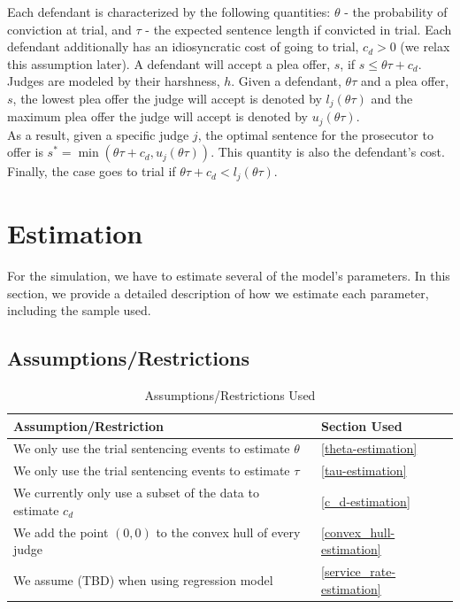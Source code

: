 \documentclass[11pt, oneside]{article}   	%
\theoremstyle{ModifiedStyle}
\begin{document}
  Each defendant is characterized by the following quantities: $\theta$ - the probability of conviction at trial, and $\tau$ - the expected sentence length if convicted in trial. Each defendant additionally has an idiosyncratic cost of going to trial, $c_d >0$ (we relax this assumption later). A defendant will accept a plea offer, $s$, if $s \leq \theta \tau + c_d$.\\

  Judges are modeled by their harshness, $h$. Given a defendant, $\theta \tau$ and a plea offer, $s$, the lowest plea offer the judge will accept is denoted by $l_j(\theta \tau)$ and the maximum plea offer the judge will accept is denoted by $u_j(\theta \tau)$.\\

  As a result, given a specific judge $j$, the optimal sentence for the prosecutor to offer is $s^* = \min(\theta \tau + c_d,u_j(\theta \tau))$. This quantity is also the defendant's cost. Finally, the case goes to trial if $\theta \tau + c_d < l_j(\theta \tau)$.

\section{Estimation}
  For the simulation, we have to estimate several of the model's parameters. In this section, we provide a detailed description of how we estimate each parameter, including the sample used.

  \subsection{Assumptions/Restrictions}
    \begin{table}[H]
      \centering
      \caption{Assumptions/Restrictions Used}
      \label{tab:assumptions}
      \begin{tabular}{ll}
      \hline
      \textbf{Assumption/Restriction}                              & \textbf{Section Used}        \\ \hline
      We only use the trial sentencing events to estimate $\theta$ & \ref{theta-estimation}       \\
      We only use the trial sentencing events to estimate $\tau$   & \ref{tau-estimation}         \\
      We currently only use a subset of the data to estimate $c_d$ & \ref{c_d-estimation}         \\
      We add the point $(0,0)$ to the convex hull of every judge   & \ref{convex_hull-estimation} \\
      We assume (TBD) when using regression model & \ref{service_rate-estimation} \\ \hline
      \end{tabular}
    \end{table}
\end{document}
